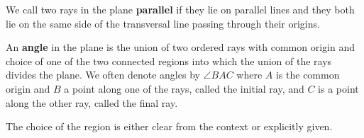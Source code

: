 \documentclass[instructornotes]{ximera}
\begin{document}
\begin{definition}
We call two rays in the plane \textbf{parallel} if they lie on
parallel lines and they both lie on the same side of the transversal
line passing through their origins.
\end{definition}

\begin{definition} An \textbf{angle} in the plane is the union of two ordered
rays with common origin and choice of one of the two connected regions
into which the union of the rays divides the plane. We often denote
angles by $\angle BAC$ where $A$ is the common origin and $B$ a point
along one of the rays, called the initial ray, and $C$ is a point
along the other ray, called the final ray.
\end{definition}


The choice of the region is either clear from the context or
explicitly given.
\end{document}
